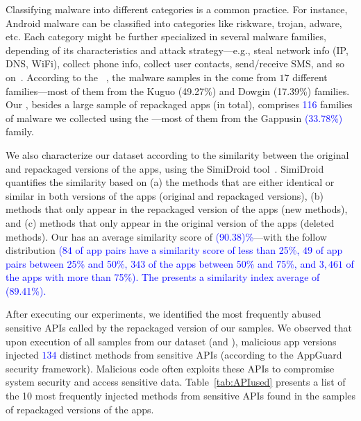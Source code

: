 Classifying malware into different categories is a common practice. For instance, Android malware can be classified into categories
like riskware, trojan, adware, etc. Each category might be further specialized in several malware families, depending of its
characteristics and attack strategy---e.g., steal network info (IP, DNS, WiFi), collect phone info,
collect user contacts, send/receive SMS, and so on~\cite{DBLP:conf/iccns/RahaliLKTGM20}.
According to the
\avt~\cite{avclass2-paper}, the malware samples in the \sds come from $17$ different families---most of them from the Kuguo (49.27\%) and Dowgin (17.39\%) families.  
Our \cds, besides a large sample of repackaged apps (\apps in total),
comprises \textcolor{blue}{116} families of malware we collected using the \avt---most
of them from the Gappusin \textcolor{blue}{(33.78\%)} family.

We also characterize our dataset according to the similarity
between the original and repackaged versions of the apps, using the  
SimiDroid tool~\cite{DBLP:conf/trustcom/0029BK17}. SimiDroid quantifies the similarity
based on (a) the methods that are either identical or similar in both versions of the apps (original and repackaged versions),
(b) methods that only appear in the repackaged version of the apps (new methods), and (c) methods that only appear in the
original version of the apps (deleted methods).
Our \cds has an average similarity score of \textcolor{blue}{(90.38)\%}---with the follow distribution \textcolor{blue}{($84$ of
app pairs have a similarity score of less than 25\%, $49$ of app pairs
between 25\% and 50\%,  $343$ of the apps between 50\% and 75\%,
and $3,461$ of the apps with more than 75\%). The \sds presents a similarity index average of (89.41\%). }


After executing our experiments, we identified the  most frequently abused sensitive APIs called by the repackaged version of our samples.
We observed that upon execution of all samples from our dataset (\sds and \cds), malicious app versions injected \textcolor{blue}{$134$} distinct methods from sensitive APIs (according to the
AppGuard~\cite{DBLP:conf/esorics/BackesGHMS13} security framework).
Malicious code often exploits these APIs to compromise system security and access sensitive data. Table~\ref{tab:APIused}
presents a list of the 10 most frequently injected methods from sensitive APIs found in the
\cds samples of repackaged versions of the apps.

